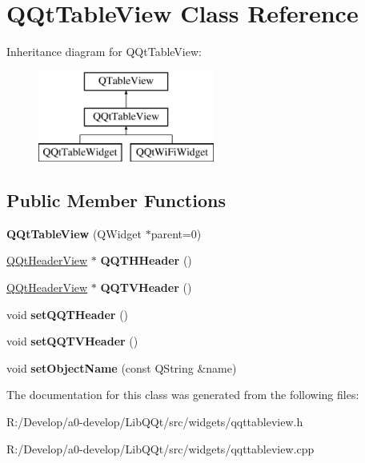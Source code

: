 \hypertarget{class_q_qt_table_view}{}\section{Q\+Qt\+Table\+View Class Reference}
\label{class_q_qt_table_view}
Inheritance diagram for Q\+Qt\+Table\+View\+:\begin{figure}[H]
\begin{center}
\leavevmode
\includegraphics[height=3.000000cm]{class_q_qt_table_view}
\end{center}
\end{figure}
\subsection*{Public Member Functions}
\begin{DoxyCompactItemize}
\item 
\mbox{\label{class_q_qt_table_view_ae6ccff3f8b24c7a99b6852e9ee770e78}} 
{\bfseries Q\+Qt\+Table\+View} (Q\+Widget $\ast$parent=0)
\item 
\mbox{\label{class_q_qt_table_view_a83c91e50ba6716bc5f742ce7e1a14b55}} 
\mbox{\hyperlink{class_q_qt_header_view}{Q\+Qt\+Header\+View}} $\ast$ {\bfseries Q\+Q\+T\+H\+Header} ()
\item 
\mbox{\label{class_q_qt_table_view_ad49a2dc47cdb17044f8f4697eb17a17a}} 
\mbox{\hyperlink{class_q_qt_header_view}{Q\+Qt\+Header\+View}} $\ast$ {\bfseries Q\+Q\+T\+V\+Header} ()
\item 
\mbox{\label{class_q_qt_table_view_ab0768be9034cf8b870ac376a9db3507d}} 
void {\bfseries set\+Q\+Q\+T\+Header} ()
\item 
\mbox{\label{class_q_qt_table_view_a9ab0660cd8d3e6b077df1b80e3954e1e}} 
void {\bfseries set\+Q\+Q\+T\+V\+Header} ()
\item 
\mbox{\label{class_q_qt_table_view_a9982536bb842058ff95f8db155a77eb8}} 
void {\bfseries set\+Object\+Name} (const Q\+String \&name)
\end{DoxyCompactItemize}


The documentation for this class was generated from the following files\+:\begin{DoxyCompactItemize}
\item 
R\+:/\+Develop/a0-\/develop/\+Lib\+Q\+Qt/src/widgets/qqttableview.\+h\item 
R\+:/\+Develop/a0-\/develop/\+Lib\+Q\+Qt/src/widgets/qqttableview.\+cpp\end{DoxyCompactItemize}

